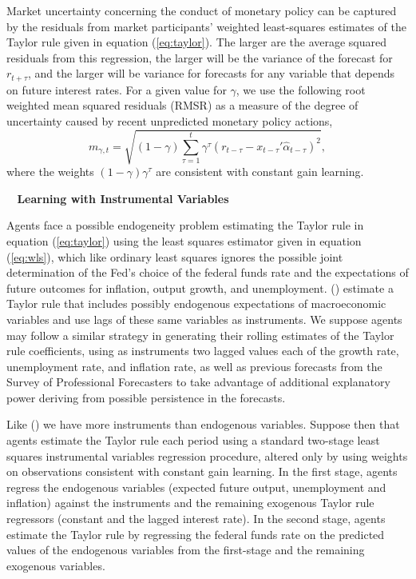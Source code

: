 \documentclass[12pt]{article}
\newcommand{\beq}{\begin{equation}}
\newcommand{\eeq}{\end{equation}}
\newcommand{\citee}[1]{\citeauthor{#1} (\citeyear{#1})}
\newcommand{\ds}{\displaystyle}
\renewcommand{\subsection}[1]{\addtocounter{subsection}{1}\begin{center}\textbf{\thesubsection~ #1}\end{center}}
\begin{document}
Market uncertainty concerning the conduct of monetary policy can be captured by the residuals from market participants' weighted least-squares estimates of the Taylor rule given in equation (\ref{eq:taylor}).  The larger are the average squared residuals from this regression, the larger will be the variance of the forecast for $r_{t+\tau}$, and the larger will be variance for forecasts for any variable that depends on future interest rates.  For a given value for $\gamma$, we use the following root weighted mean squared residuals (RMSR) as a measure of the degree of uncertainty caused by recent unpredicted monetary policy actions,
\beq \label{eq:mpu} m_{\gamma,t} = \sqrt{ (1-\gamma) \ds \sum_{\tau=1}^{t} \gamma^{\tau} (r_{t-\tau} - x_{t-\tau}'\hat{\alpha}_{t-\tau} )^2}, \eeq  
where the weights $(1-\gamma) \gamma^{\tau}$ are consistent with constant gain learning.

\subsection{Learning with Instrumental Variables}
Agents face a possible endogeneity problem estimating the Taylor rule in equation (\ref{eq:taylor}) using the least squares estimator given in equation (\ref{eq:wls}), which like ordinary least squares ignores the possible joint determination of the Fed's choice of the federal funds rate and the expectations of future outcomes for inflation, output growth, and unemployment.  \citee{cgg2000} estimate a Taylor rule that includes possibly endogenous expectations of macroeconomic variables and use lags of these same variables as instruments.  We suppose agents may follow a similar strategy in generating their rolling estimates of the Taylor rule coefficients, using as instruments two lagged values each of the growth rate, unemployment rate, and inflation rate, as well as previous forecasts from the Survey of Professional Forecasters to take advantage of additional explanatory power deriving from possible persistence in the forecasts.  

Like \citee{cgg2000} we have more instruments than endogenous variables.  Suppose then that agents estimate the Taylor rule each period using a standard two-stage least squares instrumental variables regression procedure, altered only by using weights on observations consistent with constant gain learning.  In the first stage, agents regress the endogenous variables (expected future output, unemployment and inflation) against the instruments and the remaining exogenous Taylor rule regressors (constant and the lagged interest rate).  In the second stage, agents estimate the Taylor rule by regressing the federal funds rate on the predicted values of the endogenous variables from the first-stage and the remaining exogenous variables.
\end{document}
